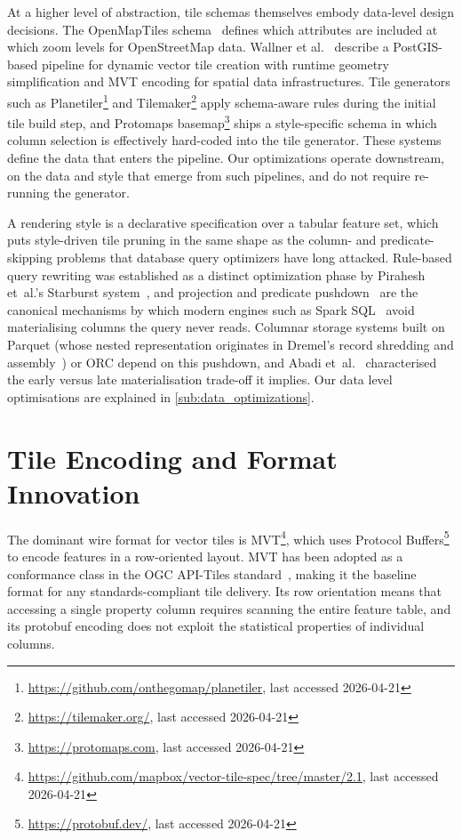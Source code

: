 At a higher level of abstraction, tile schemas themselves embody data-level design decisions.
The OpenMapTiles schema~\cite{VectorTilesAre2025} defines which attributes are included at which zoom levels for OpenStreetMap data.
Wallner et al.~\cite{wallnerOpenSourceVector2022} describe a PostGIS-based pipeline for dynamic vector tile creation with runtime geometry simplification and \ac{MVT} encoding for spatial data infrastructures.
Tile generators such as Planetiler\footnote{\url{https://github.com/onthegomap/planetiler}, last accessed 2026-04-21} and Tilemaker\footnote{\url{https://tilemaker.org/}, last accessed 2026-04-21} apply schema-aware rules during the initial tile build step, and Protomaps basemap\footnote{\url{https://protomaps.com}, last accessed 2026-04-21} ships a style-specific schema in which column selection is effectively hard-coded into the tile generator.
These systems define the data that enters the pipeline.
Our optimizations operate downstream, on the data and style that emerge from such pipelines, and do not require re-running the generator.

A rendering style is a declarative specification over a tabular feature set, which puts style-driven tile pruning in the same shape as the column- and predicate-skipping problems that database query optimizers have long attacked.
Rule-based query rewriting was established as a distinct optimization phase by Pirahesh et~al.'s Starburst system~\cite{piraheshExtensibleRuleBased1992}, and projection and predicate pushdown~\cite{graefeQueryEvaluationTechniques1993} are the canonical mechanisms by which modern engines such as Spark SQL~\cite{armbrustSparkSQLRelational2015} avoid materialising columns the query never reads.
Columnar storage systems built on Parquet (whose nested representation originates in Dremel's record shredding and assembly~\cite{melnikDremelInteractiveAnalysis}) or ORC depend on this pushdown, and Abadi et~al.~\cite{abadiMaterializationStrategiesColumnOriented2007} characterised the early versus late materialisation trade-off it implies.
Our data level optimisations are explained in \cref{sub:data_optimizations}.

\section{Tile Encoding and Format Innovation}\label{sec:rw_tile_encoding}

The dominant wire format for vector tiles is \ac{MVT}\footnote{\url{https://github.com/mapbox/vector-tile-spec/tree/master/2.1}, last accessed 2026-04-21}, which uses Protocol Buffers\footnote{\url{https://protobuf.dev/}, last accessed 2026-04-21} to encode features in a row-oriented layout.
\ac{MVT} has been adopted as a conformance class in the \ac{OGC} API-Tiles standard~\cite{OGCAPITiles}, making it the baseline format for any standards-compliant tile delivery.
Its row orientation means that accessing a single property column requires scanning the entire feature table, and its protobuf encoding does not exploit the statistical properties of individual columns.


